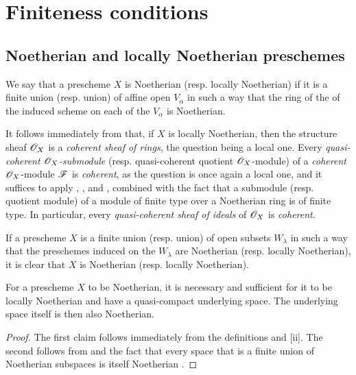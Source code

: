 \section{Finiteness conditions}
\label{section:I.6}

\subsection{Noetherian and locally Noetherian preschemes}
\label{subsection:I.6.1}

\begin{definition}[6.1.1]
\label{I.6.1.1}
We say that a prescheme $X$ is Noetherian (resp. locally Noetherian) if it is a finite union (resp. union) of affine open $V_\alpha$ in such a way that the ring of the of the induced scheme on each of the $V_\alpha$ is Noetherian.
\end{definition}

It follows immediately from  that, if $X$ is locally Noetherian, then the structure sheaf $\mathscr{O}_X$ is a \emph{coherent sheaf of rings}, the question being a local one.
Every \emph{quasi-coherent $\mathscr{O}_X$-submodule}
(resp. quasi-coherent quotient $\mathscr{O}_X$-module) of a \emph{coherent} $\mathscr{O}_X$-module $\mathscr{F}$ is \emph{coherent}, as the question is once again a local one, and it suffices to apply , , and , combined with the fact that a submodule (resp. quotient module) of a module of finite type over a Noetherian ring is of finite type.
In particular, every \emph{quasi-coherent sheaf of ideals} of $\mathscr{O}_X$ is \emph{coherent}.

If a prescheme $X$ is a finite union (resp. union) of open subsets $W_\lambda$ in such a way that the preschemes induced on the $W_\lambda$ are Noetherian (resp. locally Noetherian), it is clear that $X$ is Noetherian (resp. locally Noetherian).

\begin{proposition}[6.1.2]
\label{I.6.1.2}
For a prescheme $X$ to be Noetherian, it is necessary and sufficient for it to be locally Noetherian and have a quasi-compact underlying space.
The underlying space itself is then also Noetherian.
\end{proposition}

\begin{proof}
\label{proof-1.6.1.2}
The first claim follows immediately from the definitions and [ii].
The second follows from  and the fact that every space that is a finite union of Noetherian subspaces is itself Noetherian .
\end{proof}

